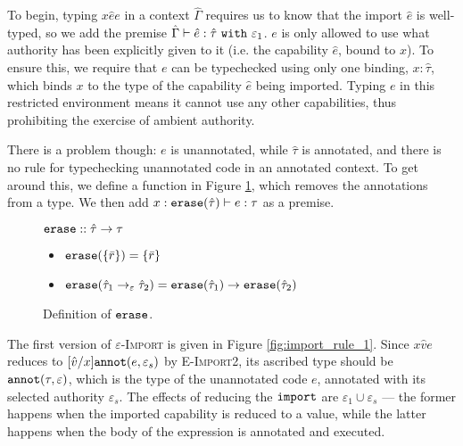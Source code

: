 To begin, typing ${x}{\hat e}{e}$ in a context
$\hat \Gamma$ requires us to know that the import $\hat e$ is
well-typed, so we add the premise
$\hat \Gamma \vdash \hat e: \hat \tau~\mathtt{with}~ \varepsilon_1$.
$e$ is only allowed to use what authority has been explicitly given to it
(i.e. the capability $\hat e$, bound to $x$). To ensure this, we require
that $e$ can be typechecked using only one binding, $x: \hat \tau$,
which binds $x$ to the type of the capability $\hat e$ being imported.
Typing $e$ in this restricted environment means it cannot use any
other capabilities, thus prohibiting the exercise of ambient authority.

There is a problem though: $e$ is unannotated, while $\hat \tau$ is
annotated, and there is no rule for typechecking unannotated code in
an annotated context. To get around this, we define a function
 in Figure \ref{fig:erase_defn}, which removes the
annotations from a type. We then add
$x: \mathtt{erase}(\hat \tau) \vdash e: \tau$ as a premise.


\begin{figure}
$\mathtt{erase} :: \hat \tau \rightarrow \tau$
\begin{itemize}
	\setlength\itemsep{-0.2em}
	\item[] $\mathtt{erase}(\{ \bar r \}) = \{ \bar r \}$
	\item[] $\mathtt{erase}(\hat \tau_1 \rightarrow_{\varepsilon} \hat \tau_2) = \mathtt{erase}(\hat \tau_1) \rightarrow \mathtt{erase}(\hat \tau_2)$
\end{itemize}

\vspace{-0.5cm}
\caption{Definition of $\mathtt{erase}$.}
\vspace{-0.5cm}
\label{fig:erase_defn}
\end{figure}

The first version of \textsc{$\varepsilon$-Import} is given in Figure
\ref{fig:import_rule_1}. Since
${x}{\hat v}{e}$ reduces to $[\hat
v/x]\mathtt{annot}(e, \varepsilon_s)$ by \textsc{E-Import2}, its ascribed type
should be $\mathtt{annot}(\tau, \varepsilon)$, which is the type of the unannotated
code $e$, annotated with its selected authority $\varepsilon_s$. The
effects of reducing the $\mathtt{import}$ are $\varepsilon_1 \cup \varepsilon_s$
--- the former happens when the imported capability is reduced to a value,
while the latter happens when the body of the  expression is
annotated and executed.

